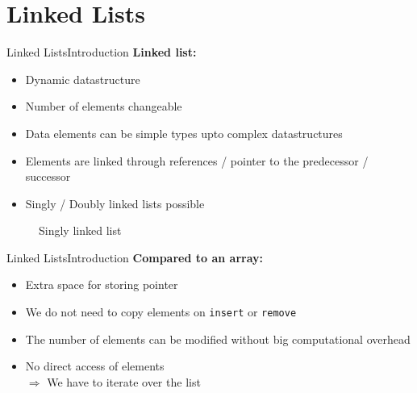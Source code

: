 \section{Linked Lists}

\begin{frame}{Linked Lists}{Introduction}
  \textbf{Linked list:}
  \begin{itemize}
    \item
      Dynamic datastructure
    \item
      Number of elements changeable
    \item
      Data elements can be simple types upto complex datastructures
    \item
      Elements are linked through references / pointer to the predecessor /
      successor
    \item
      Singly / Doubly linked lists possible
  \end{itemize}
  \begin{figure}
    
    \caption{Singly linked list}
    \label{fig:linked_list:singly_linked_list}
  \end{figure}
\end{frame}


\begin{frame}{Linked Lists}{Introduction}
  \textbf{Compared to an array:}
  \begin{itemize}
    \item
      Extra space for storing pointer
    \item
      We do not need to copy elements on {\color{Mittel-Blau}\texttt{insert}}
      or {\color{Mittel-Blau}\texttt{remove}}
    \item
      The number of elements can be modified without big computational overhead
    \item
      No direct access of elements\\
      $\Rightarrow$ We have to iterate over the list
  \end{itemize}
\end{frame}


